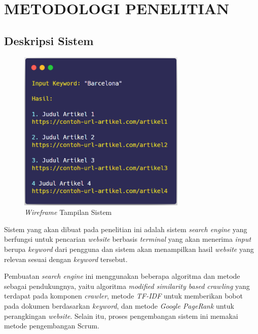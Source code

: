 
\chapter{METODOLOGI PENELITIAN}

\section{Deskripsi Sistem}

\begin{figure}[H]
	\centering
	\includegraphics[keepaspectratio, width=8cm]{gambar/tampilan_sistem}
	\caption{\textit{Wireframe} Tampilan Sistem}
	\label{gambar:tampilan_sistem}
\end{figure}

Sistem yang akan dibuat pada penelitian ini adalah sistem \textit{search engine} yang berfungsi untuk pencarian \textit{website} berbasis \textit{terminal} yang akan menerima \textit{input} berupa \textit{keyword} dari pengguna dan sistem akan menampilkan hasil \textit{website} yang relevan sesuai dengan \textit{keyword} tersebut.

Pembuatan \textit{search engine} ini menggunakan beberapa algoritma dan metode sebagai pendukungnya, yaitu algoritma \textit{modified similarity based crawling} yang terdapat pada komponen \textit{crawler}, metode \textit{TF-IDF} untuk memberikan bobot pada dokumen berdasarkan \textit{keyword}, dan metode \textit{Google PageRank} untuk perangkingan \textit{website}. Selain itu, proses pengembangan sistem ini memakai metode pengembangan Scrum.

